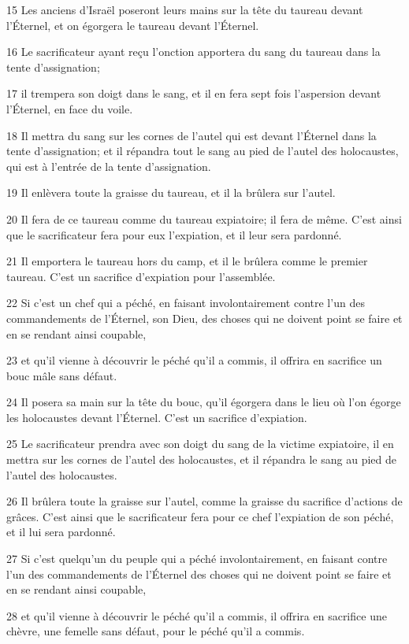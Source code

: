 \par 15 Les anciens d'Israël poseront leurs mains sur la tête du taureau devant l'Éternel, et on égorgera le taureau devant l'Éternel.
\par 16 Le sacrificateur ayant reçu l'onction apportera du sang du taureau dans la tente d'assignation;
\par 17 il trempera son doigt dans le sang, et il en fera sept fois l'aspersion devant l'Éternel, en face du voile.
\par 18 Il mettra du sang sur les cornes de l'autel qui est devant l'Éternel dans la tente d'assignation; et il répandra tout le sang au pied de l'autel des holocaustes, qui est à l'entrée de la tente d'assignation.
\par 19 Il enlèvera toute la graisse du taureau, et il la brûlera sur l'autel.
\par 20 Il fera de ce taureau comme du taureau expiatoire; il fera de même. C'est ainsi que le sacrificateur fera pour eux l'expiation, et il leur sera pardonné.
\par 21 Il emportera le taureau hors du camp, et il le brûlera comme le premier taureau. C'est un sacrifice d'expiation pour l'assemblée.
\par 22 Si c'est un chef qui a péché, en faisant involontairement contre l'un des commandements de l'Éternel, son Dieu, des choses qui ne doivent point se faire et en se rendant ainsi coupable,
\par 23 et qu'il vienne à découvrir le péché qu'il a commis, il offrira en sacrifice un bouc mâle sans défaut.
\par 24 Il posera sa main sur la tête du bouc, qu'il égorgera dans le lieu où l'on égorge les holocaustes devant l'Éternel. C'est un sacrifice d'expiation.
\par 25 Le sacrificateur prendra avec son doigt du sang de la victime expiatoire, il en mettra sur les cornes de l'autel des holocaustes, et il répandra le sang au pied de l'autel des holocaustes.
\par 26 Il brûlera toute la graisse sur l'autel, comme la graisse du sacrifice d'actions de grâces. C'est ainsi que le sacrificateur fera pour ce chef l'expiation de son péché, et il lui sera pardonné.
\par 27 Si c'est quelqu'un du peuple qui a péché involontairement, en faisant contre l'un des commandements de l'Éternel des choses qui ne doivent point se faire et en se rendant ainsi coupable,
\par 28 et qu'il vienne à découvrir le péché qu'il a commis, il offrira en sacrifice une chèvre, une femelle sans défaut, pour le péché qu'il a commis.
